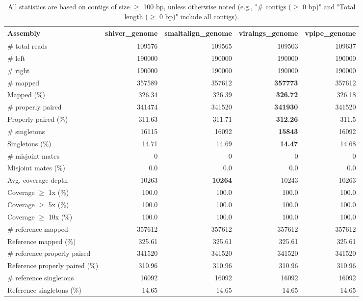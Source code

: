 \documentclass[12pt,a4paper]{article}
\begin{document}
\begin{table}[ht]
\begin{center}
\caption{All statistics are based on contigs of size $\geq$ 100 bp, unless otherwise noted (e.g., "\# contigs ($\geq$ 0 bp)" and "Total length ($\geq$ 0 bp)" include all contigs).}
\begin{tabular}{|l*{4}{|r}|}
\hline
Assembly & shiver\_genome & smaltalign\_genome & viralngs\_genome & vpipe\_genome \\ \hline
\# total reads & 109576 & 109565 & 109503 & 109637 \\ \hline
\# left & 190000 & 190000 & 190000 & 190000 \\ \hline
\# right & 190000 & 190000 & 190000 & 190000 \\ \hline
\# mapped & 357589 & 357612 & {\bf 357773} & 357612 \\ \hline
Mapped (\%) & 326.34 & 326.39 & {\bf 326.72} & 326.18 \\ \hline
\# properly paired & 341474 & 341520 & {\bf 341930} & 341520 \\ \hline
Properly paired (\%) & 311.63 & 311.71 & {\bf 312.26} & 311.5 \\ \hline
\# singletons & 16115 & 16092 & {\bf 15843} & 16092 \\ \hline
Singletons (\%) & 14.71 & 14.69 & {\bf 14.47} & 14.68 \\ \hline
\# misjoint mates & 0 & 0 & 0 & 0 \\ \hline
Misjoint mates (\%) & 0.0 & 0.0 & 0.0 & 0.0 \\ \hline
Avg. coverage depth & 10263 & {\bf 10264} & 10243 & 10263 \\ \hline
Coverage $\geq$ 1x (\%) & 100.0 & 100.0 & 100.0 & 100.0 \\ \hline
Coverage $\geq$ 5x (\%) & 100.0 & 100.0 & 100.0 & 100.0 \\ \hline
Coverage $\geq$ 10x (\%) & 100.0 & 100.0 & 100.0 & 100.0 \\ \hline
\# reference mapped & 357612 & 357612 & 357612 & 357612 \\ \hline
Reference mapped (\%) & 325.61 & 325.61 & 325.61 & 325.61 \\ \hline
\# reference properly paired & 341520 & 341520 & 341520 & 341520 \\ \hline
Reference properly paired (\%) & 310.96 & 310.96 & 310.96 & 310.96 \\ \hline
\# reference singletons & 16092 & 16092 & 16092 & 16092 \\ \hline
Reference singletons (\%) & 14.65 & 14.65 & 14.65 & 14.65 \\ \hline

\end{tabular}
\end{center}
\end{table}
\end{document}
